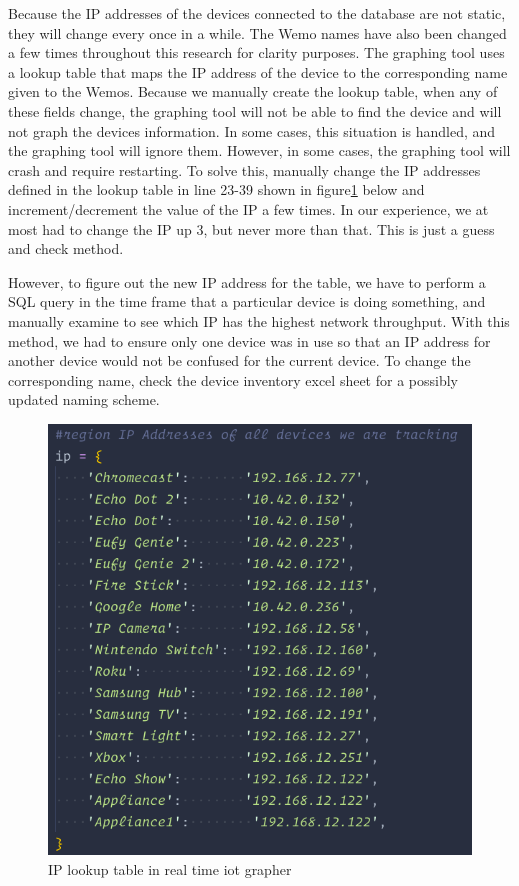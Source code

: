 Because the IP addresses of the devices connected to the database are not static, they will change every once in a while. The Wemo names have also been changed a few times throughout this research for clarity purposes. The graphing tool uses a lookup table that maps the IP address of the device to the corresponding name given to the Wemos. Because we manually create the lookup table, when any of these fields change, the graphing tool will not be able to find the device and will not graph the devices information. In some cases, this situation is handled, and the graphing tool will ignore them. However, in some cases, the graphing tool will crash and require restarting. To solve this, manually change the IP addresses defined in the lookup table in line 23-39 shown in figure\ref{fig:ipLookup} below and increment/decrement the value of the IP a few times. In our experience, we at most had to change the IP up 3, but never more than that. This is just a guess and check method.

However, to figure out the new IP address for the table, we have to perform a SQL query in the time frame that a particular device is doing something, and manually examine to see which IP has the highest network throughput. With this method, we had to ensure only one device was in use so that an IP address for another device would not be confused for the current device. To change the corresponding name, check the device inventory excel sheet for a possibly updated naming scheme.

\begin{figure}[H]
    \centering
    \includegraphics[width=1\textwidth]{figures/ipLookup.png}
    \caption{IP lookup table in real time iot grapher}
    \label{fig:ipLookup}
\end{figure}

